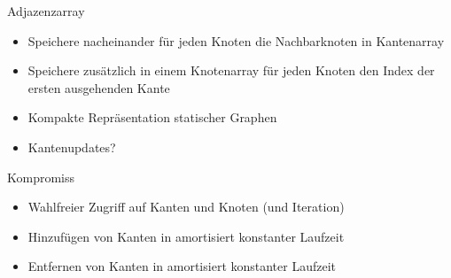 \begin{frame}{Adjazenzarray}
	\begin{itemize}
		\item Speichere nacheinander für jeden Knoten die Nachbarknoten in Kantenarray
		\item Speichere zusätzlich in einem Knotenarray für jeden Knoten den Index der ersten ausgehenden Kante
		\item Kompakte Repräsentation statischer Graphen
		\item Kantenupdates?
	\end{itemize}
\end{frame}
\begin{frame}{Kompromiss}
	\begin{itemize}
		\item Wahlfreier Zugriff auf Kanten und Knoten (und Iteration)
		\item Hinzufügen von Kanten in amortisiert konstanter Laufzeit
		\item Entfernen von Kanten in amortisiert konstanter Laufzeit
	\end{itemize}
\end{frame}


